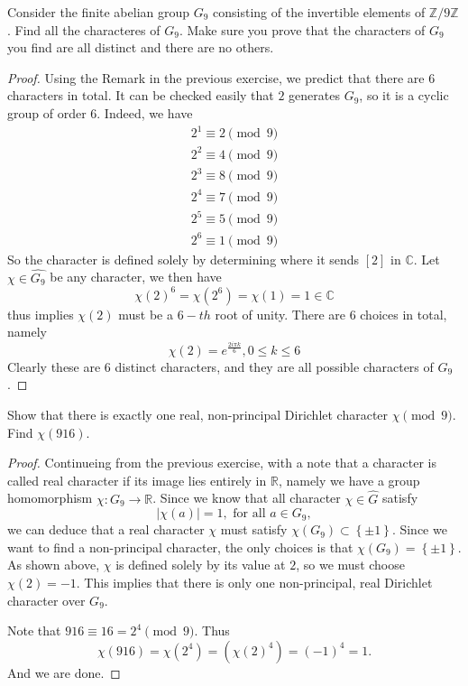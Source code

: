 \documentclass[11pt,letterpaper]{article}
\DeclareMathOperator{\1}{\mathbbm{1}}
\begin{document}
\begin{exercise}
  \label{ex3}
  Consider the finite abelian group $G_9$ consisting of the invertible elements of $\mathbb{Z}/9\mathbb{Z}$. Find all the characteres of $G_9$.
  Make sure you prove that the characters of $G_9$ you find are all distinct and there are no others.
\end{exercise}
\begin{proof}
  Using the Remark in the previous exercise, we predict that there are $6$ characters in total. It can be checked easily that $2$ generates $G_9$, so it is a
  cyclic group of order $6$. Indeed, we have
  \begin{align*}
    2^1 \equiv 2 \pmod 9 \\
    2^2 \equiv 4 \pmod 9 \\
    2^3 \equiv 8 \pmod 9 \\
    2^4 \equiv 7 \pmod 9 \\
    2^5 \equiv 5 \pmod 9 \\
    2^6 \equiv 1 \pmod 9
  \end{align*}
  So the character is defined solely by determining where it sends $[2]$ in $\mathbb{C}$. Let $\chi \in \hat{G_9}$ be
  any character, we then have
  \[\chi(2)^6=\chi(2^6) = \chi(1) = 1 \in \mathbb{C}\]
  thus implies $\chi(2)$ must be a $6-th$ root of unity. There are $6$ choices in total, namely
  \[\chi(2) = e^{\frac{2i\pi k}{6}}, 0 \le k \le 6\]
  Clearly these are 6 distinct characters, and they are all possible characters of $G_9$.
\end{proof}

\begin{exercise}
  Show that there is exactly one real, non-principal Dirichlet character $\chi \pmod 9$. Find $\chi(916)$.
\end{exercise}
\begin{proof}
  Continueing from the previous exercise, with a note that a character is called real character if its image lies entirely in
  $\mathbb{R}$, namely  we have a group homomorphism $\chi\colon G_9 \to \mathbb{R}$. Since we know that all character $\chi \in \hat{G}$ satisfy
  \[|\chi(a)| =1, \text{ for all } a \in G_9,\]
  we can deduce that a real character $\chi$ must satisfy $\chi(G_9) \subset \left\lbrace \pm 1 \right\rbrace$. Since
  we want to find a non-principal character, the only choices is that $\chi(G_9) = \left\lbrace \pm 1\right\rbrace$. As shown
  above, $\chi$ is defined solely by its value at $2$, so we must choose $\chi(2) =-1$. This implies that there is only
  one non-principal, real Dirichlet character over $G_9$.

  Note that $916 \equiv 16 = 2^4 \pmod 9$. Thus
  \[ \chi(916) = \chi (2^4) = (\chi(2)^4) = (-1)^4=1.\]
  And we are done.
\end{proof}
\end{document}
